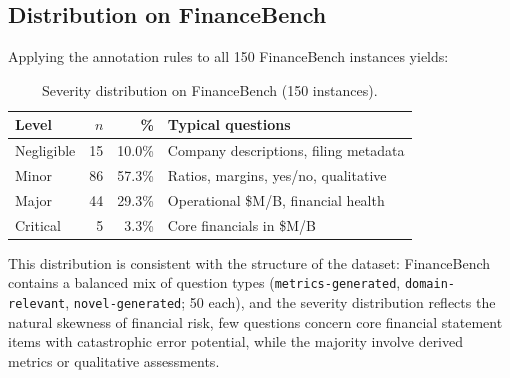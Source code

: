 \subsection{Distribution on FinanceBench}
\label{sec:distribution}

Applying the annotation rules to all 150 FinanceBench instances yields:

\begin{table}[h]
\centering
\footnotesize
\setlength{\tabcolsep}{4pt}
\begin{tabular}{@{}lrrp{3cm}@{}}
\toprule
Level & $n$ & \% & Typical questions \\
\midrule
Negligible & 15 & 10.0\% & Company descriptions, filing metadata \\
Minor      & 86 & 57.3\% & Ratios, margins, yes/no, qualitative \\
Major      & 44 & 29.3\% & Operational \$M/B, financial health \\
Critical   &  5 &  3.3\% & Core financials in \$M/B \\
\bottomrule
\end{tabular}
\caption{Severity distribution on FinanceBench (150 instances).}
\label{tab:financebench-distribution}
\end{table}

This distribution is consistent with the structure of the dataset:
FinanceBench contains a balanced mix of question types
(\texttt{metrics-generated}, \texttt{domain-relevant},
\texttt{novel-generated}; 50 each), and the severity distribution
reflects the natural skewness of financial risk, few questions concern
core financial statement items with catastrophic error potential, while
the majority involve derived metrics or qualitative assessments.
